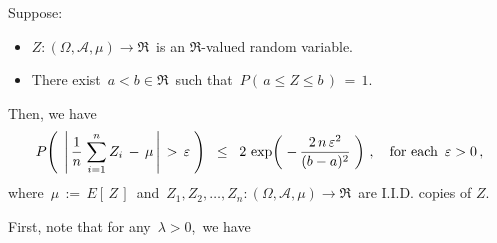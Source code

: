 
\vskip 1.0cm
\begin{lemma}
\label{lemma:HoeffdingInequality}
\mbox{}\vskip 0.2cm
\noindent
Suppose:
\begin{itemize}
\item
	$Z : (\Omega,\mathcal{A},\mu) \longrightarrow \Re$\,
	is an $\Re$-valued random variable.
\item
	There exist \,$a < b \in \Re$\, such that \,$P\!\left(\,a \leq Z \leq b\,\right) \,=\, 1$.
\end{itemize}
Then, we have
\begin{equation*}
P\!\left(\;\,\left\vert\,
	\dfrac{1}{n}\;\overset{n}{\underset{i=1}{\sum}}\,Z_{i} \, - \, \mu
	\,\right\vert
	\,>\,\varepsilon
	\;\right)
\;\; \leq \;\;
	2\,\exp\!\left(\;
		-\,\dfrac{
			2\,n\,\varepsilon^{2}
			}{
			(b-a)^{2}
			}
		\;\right)\,,
\quad
\textnormal{for each \,$\varepsilon > 0$}\,,
\end{equation*}
where
\,$\mu \, := \, E\!\left[\,Z\,\right]$\, and
\,$Z_{1}, Z_{2}, \ldots, Z_{n} : (\Omega,\mathcal{A},\mu) \longrightarrow \Re$\,
are I.I.D. copies of $Z$.
\end{lemma}
\proof
First, note that for any \,$\lambda > 0$,\, we have
